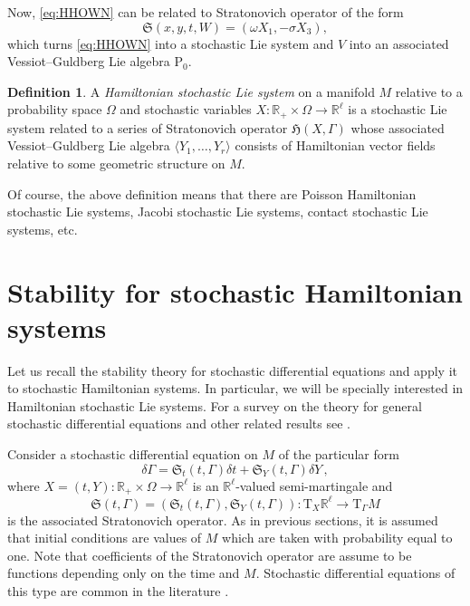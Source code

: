 \documentclass[11pt]{article}
\theoremstyle{plain}
\theoremstyle{definition}
\newtheorem{definition}[theorem]{Definition}
\newcommand{\R}{\mathbb{R}}
\newcommand{\T}{\mathrm{T}}
\begin{document}
Now, \eqref{eq:HHOWN} can be related to  Stratonovich operator of the form
 $$
\mathfrak{S}(x ,y ,t,W)=\left(\omega X_1,-\sigma X_3\right),
 $$
 which turns \eqref{eq:HHOWN} into a stochastic Lie system and $V$ into an associated Vessiot--Guldberg Lie algebra P$_0$.


\begin{definition} A {\it Hamiltonian stochastic Lie system} on a manifold $M$ relative to a probability space $\Omega$ and stochastic variables $X:\mathbb{R}_+\times\Omega\rightarrow \mathbb{R}^\ell$ is a stochastic Lie system related to a series of Stratonovich operator $\mathfrak{H}(X,\Gamma)$ whose associated Vessiot--Guldberg Lie algebra $\langle Y_1,\ldots,Y_r\rangle$ consists of Hamiltonian vector fields relative to some geometric structure on $M$.
\end{definition}

Of course, the above definition means that there are Poisson Hamiltonian stochastic Lie systems, Jacobi stochastic Lie systems, contact stochastic Lie systems, etc.

\section{Stability for stochastic Hamiltonian systems}\label{Sec:SHS}
Let us recall the stability theory for stochastic differential equations and apply it to stochastic Hamiltonian systems. In particular, we will be specially interested in Hamiltonian stochastic Lie systems. For a survey on the theory for general stochastic differential equations and other related results see \cite{Ar74,LP08,Sa70}.

Consider a stochastic differential equation on $M$ of the particular form \begin{equation}
  \label{stochastic} \delta \Gamma =\mathfrak{S}_t (t,
  \Gamma)\delta t+ \mathfrak{S}_Y (t,
  \Gamma) \delta Y\,,
\end{equation}
where $X=(t,Y):\mathbb{R}_+ \times \Omega \rightarrow \R^\ell$ is an
$\R^\ell$-valued semi-martingale and 
$$\mathfrak{S} (t, \Gamma)=(\mathfrak{S}_t(t,\Gamma),\mathfrak{S}_Y(t,\Gamma)) : \T_X \mathbb{R}^\ell
\to \T_\Gamma M$$ is the associated Stratonovich operator. As in previous sections, it is assumed that initial conditions are values of $M$ which are taken with probability equal to one. Note that coefficients of the Stratonovich operator are assume to be functions depending only on the time and $M$. Stochastic differential equations of this type are common in the literature \cite{BCC_01}.
\end{document}
